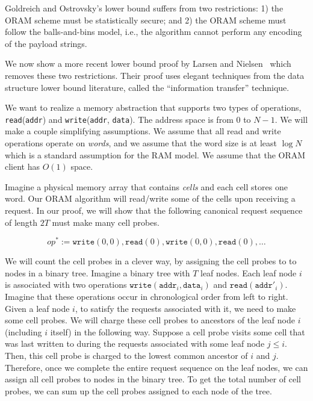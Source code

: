 Goldreich and Ostrovsky's lower bound suffers from two restrictions:
1) the ORAM scheme must be statistically secure; and 2) 
the ORAM scheme must follow the balls-and-bins model, i.e.,
the algorithm cannot perform any encoding of the payload strings.

We now 
show a more recent lower bound proof 
by Larsen  
and Nielsen~\cite{larsen18lowerbound} which removes these two restrictions.
Their proof uses elegant 
techniques from the data structure lower bound literature,
called the ``information transfer'' technique.



We want to realize a memory abstraction
that supports two types of operations, 
\texttt{read}(\texttt{addr}) and \texttt{write}(\texttt{addr}, \texttt{data}).
The address space is from $0$ to $N-1$.
We will make a couple simplifying assumptions. 
We assume that all read and write operations
operate on {\it words}, and we assume 
that the word size is at least $\log N$ which is a standard
assumption for the RAM model.
We assume that the ORAM client has $O(1)$ space. 

Imagine a physical memory array that contains {\it cells}
and each cell stores one word. 
Our ORAM algorithm 
will read/write  
some of the cells upon receiving a request.
In our proof, we will show that the following canonical 
request sequence of length $2T$ 
must make many cell probes.

\[op^* := \texttt{write}(0, {0}), \texttt{read}(0), 
\texttt{write}(0, {0}), \texttt{read}(0), \ldots\]


We will count the cell probes in a clever way, by assigning
the cell probes to 
to nodes in a binary tree. 
Imagine a binary tree with $T$ leaf nodes.
Each leaf node $i$ is associated with two operations
$\texttt{write}(\texttt{addr}_i, \texttt{data}_i)$
and $\texttt{read}(\texttt{addr}'_i)$.
Imagine that these operations 
occur in chronological order from left to right. 
Given a leaf node $i$, 
to satisfy the requests associated with it,
we need to make some cell probes.
We will charge these cell probes 
to ancestors of the leaf node $i$ (including $i$ itself) in the following way. 
Suppose a cell probe  
visits some cell that was last  
written to during the 
requests associated with some leaf node $j \leq i$.
Then, this cell probe is charged to the 
lowest common 
ancestor of $i$ and $j$.
Therefore, once we complete the entire request sequence
on the leaf nodes, we can assign all cell probes
to nodes in the binary tree.
To get the total number of cell probes, we can sum
up the cell probes assigned to each node of the tree.

